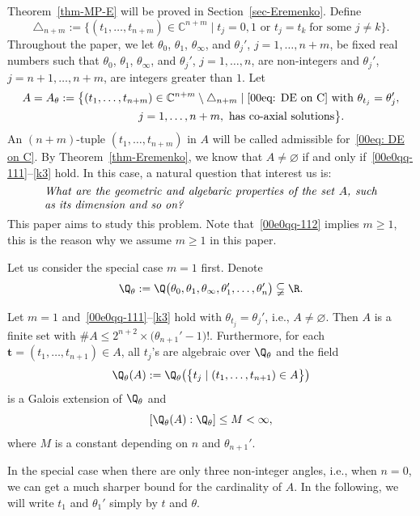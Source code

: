 Theorem~\ref{thm-MP-E} will be proved in Section~\ref{sec-Eremenko}.
Define
\[
 \triangle_{n+m}:=\bigl\{(t_1,\dots,t_{n+m})\in \mathbb{C}^{n+m}\mid
 t_j=0,1 \text{ or } t_j=t_k\;\text{for some $j\neq k$}\bigr\}.
\]
Throughout the paper, we let $\theta_0$, $\theta_1$,
$\theta_\infty$, and $\theta_j'$, $j=1,\dots,n+m$, be fixed real
numbers such that $\theta_0$, $\theta_1$, $\theta_\infty$, and
$\theta_j'$, $j=1,\dots,n$, are non-integers and $\theta_j'$,
$j=n+1,\dots,n+m$, are integers greater than $1$.
Let
\begin{gather}
 A=A_\theta:=\bigl\{(t_1,\dots,t_{n+m})\in \mathbb{C}^{n+m}\setminus
 \triangle_{n+m}\mid \text{\eqref{00eq: DE on C}
 with}\ \theta_{t_j}=\theta_j',
\nonumber\\ \hphantom{ A=A_\theta:=\{}{}
j=1,\dots,n+m, \
 \text{has co-axial solutions}\bigr\}.\label{eq: set A}
\end{gather}
An $(n+m)$-tuple $(t_1,\dots,t_{n+m})$ in $A$ will be called
admissible for~\eqref{00eq: DE on C}.
By Theorem~\ref{thm-Eremenko}, we know that $A\neq\varnothing$ if and
only if~\eqref{00e0qq-111}--\eqref{k3} hold. In this case, a natural
question that interest us is:
\[\parbox{\dimexpr\linewidth-5em}{\it
 What are the geometric and algebaric properties of the set $A$, such as its dimension and so on?
 }\]
This paper aims to study this problem. Note that~\eqref{00e0qq-112}
implies $m\geq 1$, this is the reason why we assume $m\geq 1$ in this paper.

Let us consider the special case $m=1$ first. Denote
\[
 \Q_{\theta}:=\Q\bigl(\theta_0,\theta_1,\theta_\infty,\theta_1',
 \dots,\theta_n'\bigr)\subsetneqq \R.
\]

\begin{Theorem}\label{00thm-2-2}
Let $m=1$ and~\eqref{00e0qq-111}--\eqref{k3} hold with
$\theta_{t_j}=\theta_j'$, i.e., $A\neq\varnothing$.
Then $A$ is a finite set with $\# A\leq
2^{n+2}\times\bigl(\theta_{n+1}'-1\bigr)!$. Furthermore, for each
$\boldsymbol t=(t_1,\dots,t_{n+1})\in A$, all $t_j$'s are algebraic
over $\Q_{\theta}$ and the field
\[\Q_\theta(A):=\Q_{\theta}\bigl(\bigl\{t_j \mid (t_1,\dots,t_{n+1})\in A\bigr\}\bigr)\]
is a Galois extension of $\Q_{\theta}$ and
\[[\Q_\theta(A) : \Q_\theta]\leq M<\infty,\]
where $M$ is a constant depending on $n$ and $\theta_{n+1}'$.
\end{Theorem}

In the special case when there are only three
non-integer angles, i.e., when $n=0$, we can get a much sharper bound
for the cardinality of $A$. In the following, we will write
$t_1$ and $\theta_1'$ simply by $t$ and $\theta$.


